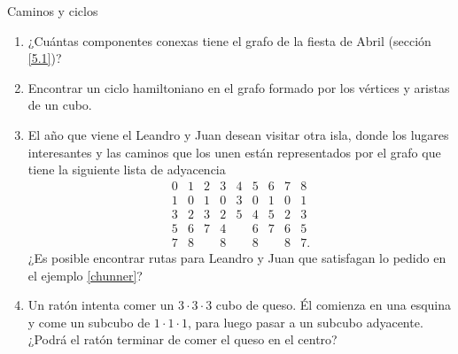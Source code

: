 \begin{section}{Caminos y ciclos}
\begin{enumerate}
\item ¿Cuántas componentes conexas tiene el grafo de la fiesta de Abril (sección \ref{5.1})?
\item Encontrar un ciclo hamiltoniano en el grafo formado por los vértices y aristas de un
cubo.
\item El año que viene el Leandro y Juan desean visitar otra isla, donde los lugares interesantes y las caminos que los unen están representados por el grafo que tiene la siguiente lista de adyacencia
$$
\begin{matrix}
0&1&2&3&4&5&6&7&8\\ \hline
1&0&1&0&3&0&1&0&1\\
3&2&3&2&5&4&5&2&3\\
5&6&7&4&&6&7&6&5\\
7&8&&8&&8&&8&7.
\end{matrix}
$$
¿Es posible encontrar rutas para Leandro y Juan que satisfagan lo pedido en el ejemplo \ref{chunner}?
\item Un ratón intenta comer un $3\cdot 3\cdot 3$ cubo de queso. Él comienza en una esquina y come un subcubo de $1\cdot 1\cdot 1$, para luego pasar a un subcubo  adyacente. ¿Podrá el ratón terminar de comer el queso en el centro?
\end{enumerate}

\end{section}



